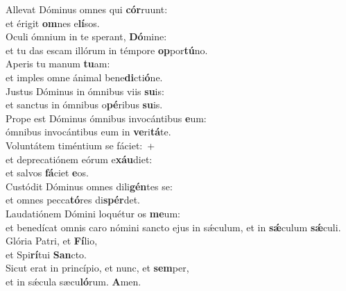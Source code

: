 \evenverse Allevat Dóminus omnes qui \textbf{cór}ruunt:~\*\\
\evenverse et érigit \textbf{om}nes e\textbf{lí}sos.\\
\oddverse Oculi ómnium in te sperant, \textbf{Dó}mine:~\*\\
\oddverse et tu das escam illórum in témpore \textbf{op}por\textbf{tú}no.\\
\evenverse Aperis tu manum \textbf{tu}am:~\*\\
\evenverse et imples omne ánimal bene\textbf{di}cti\textbf{ó}ne.\\
\oddverse Justus Dóminus in ómnibus viis \textbf{su}is:~\*\\
\oddverse et sanctus in ómnibus o\textbf{pé}ribus \textbf{su}is.\\
\evenverse Prope est Dóminus ómnibus invocántibus \textbf{e}um:~\*\\
\evenverse ómnibus invocántibus eum in \textbf{ve}ri\textbf{tá}te.\\
\oddverse Voluntátem timéntium se fáciet:~+\\
\oddverse  et deprecatiónem eórum e\textbf{xáu}diet:~\*\\
\oddverse et salvos \textbf{fá}ciet \textbf{e}os.\\
\evenverse Custódit Dóminus omnes dili\textbf{gén}tes se:~\*\\
\evenverse et omnes pecca\textbf{tó}res di\textbf{spér}det.\\
\oddverse Laudatiónem Dómini loquétur os \textbf{me}um:~\*\\
\oddverse et benedícat omnis caro nómini sancto ejus in sǽculum, et in \textbf{sǽ}culum \textbf{sǽ}culi.\\
\evenverse Glória Patri, et \textbf{Fí}lio,~\*\\
\evenverse et Spi\textbf{rí}tui \textbf{San}cto.\\
\oddverse Sicut erat in princípio, et nunc, et \textbf{sem}per,~\*\\
\oddverse et in sǽcula sæcu\textbf{ló}rum. \textbf{A}men.\\
